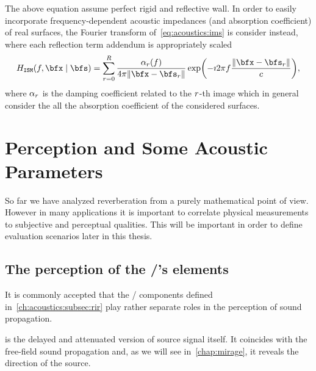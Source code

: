 The above equation assume perfect rigid and reflective wall.
In order to easily incorporate frequency-dependent acoustic impedances (and absorption coefficient)
of real surfaces, the Fourier transform of~\cref{eq:acoustics:ims} is consider instead, where
each reflection term addendum is appropriately scaled
\begin{equation}
    \label{eq:acoustics:ims}
    \rirFreq_{\mathtt{ISM}}(f, \positionMicrophone \mid \positionSource) =
        \sum_{\idxEch=0}^{\numEchs} \frac{\absCoeff_{\idxEch}(f)}{4 \pi \norm{\positionMicrophone - \positionSource_\idxEch}}
        \exp\kparen{- \Ii 2 \pi f \frac{\norm{\positionMicrophone - \positionSource_\idxEch}}{\speedOfSound}}
        ,
\end{equation}
where $\alpha_{r}$ is the damping coefficient related to the $r$-th image which in general
consider the all the absorption coefficient of the considered surfaces.


\section{Perception and Some Acoustic Parameters}\label{ch:acoustics:sec:perception}
So far we have analyzed reverberation from a purely mathematical point of view.
However in many applications it is important to correlate physical measurements to subjective and perceptual qualities.
This will be important in order to define evaluation scenarios later in this thesis.
\subsection{The perception of the \RIR/'s elements}
It is commonly accepted that the \RIR/ components defined in~\cref{ch:acoustics:subsec:rir} play rather separate roles in the perception of sound propagation.

 is the delayed and attenuated version of source signal itself.
It coincides with the free-field sound propagation and, as we will see in~\cref{chap:mirage}, it reveals the direction of the source.


